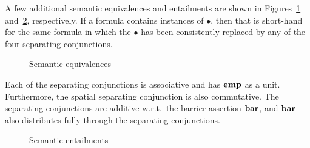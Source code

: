 \documentclass[11pt]{report}
\begin{document}
A few additional semantic equivalences and entailments are shown in Figures~\ref{fig:sequential-equivalences} and~\ref{fig:sequential-entailments}, respectively. If a formula contains instances of $\bullet$, then that is short-hand for the same formula in which the $\bullet$ has been consistently replaced by any of the four separating conjunctions. 

\begin{figure}[ht]
    \centering
    \caption{\label{fig:sequential-equivalences}Semantic equivalences}
\end{figure}

Each of the separating conjunctions is associative and has $\mathbf{emp}$ as a unit. Furthermore, the spatial separating conjunction is also commutative. The separating conjunctions are additive w.r.t.\ the barrier assertion $\mathbf{bar}$, and $\mathbf{bar}$ also distributes fully through the separating conjunctions. 

\begin{figure}[ht]
    \centering
    \caption{\label{fig:sequential-entailments}Semantic entailments}
\end{figure}
\end{document}
